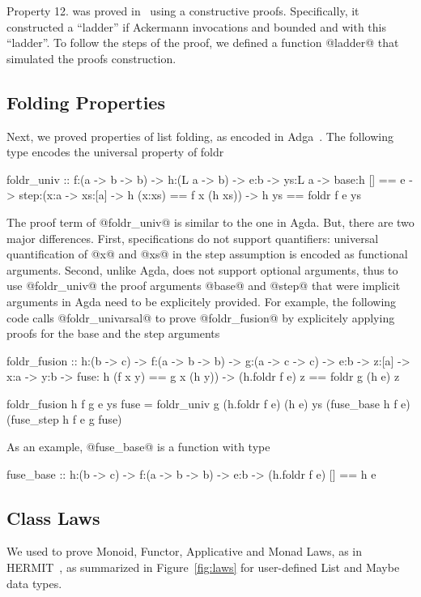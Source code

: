 Property 12. was proved in~\citep{ackermann} using a constructive proofs.
Specifically, it constructed a ``ladder'' if Ackermann invocations
and bounded  and  with this ``ladder''.
To follow the steps of the proof, we defined a function @ladder@ that
simulated the proofs construction.

\subsection{Folding Properties}\label{subsec:fold}

Next, we proved properties of list folding,
as encoded in Adga~\citep{agdaequational}.
%
The following type encodes the universal property of foldr
\begin{code}
  foldr_univ
    :: f:(a -> b -> b)
    -> h:(L a -> b)
    -> e:b
    -> ys:L a
    -> base:{h [] == e }
    -> step:(x:a -> xs:[a] ->
            {h (x:xs) == f x (h xs)})
    -> {h ys == foldr f e ys }
\end{code}
The \libname proof term of @foldr_univ@
is similar to the one in Agda.
But, there are two major differences.
First, specifications do not support quantifiers:
universal quantification of @x@ and @xs@ in
the step assumption is encoded as functional arguments.
Second, unlike Agda,
\libname does not support optional arguments,
thus to use @foldr_univ@ the proof arguments
@base@ and @step@ that were implicit arguments in Agda
need to be explicitely provided.
%
For example, the following code calls @foldr_univarsal@ to prove
@foldr_fusion@ by explicitely applying proofs for the base and the step arguments
\begin{code}
  foldr_fusion
   :: h:(b -> c)
   -> f:(a -> b -> b)
   -> g:(a -> c -> c)
   -> e:b
   -> z:[a]
   -> x:a -> y:b
   -> fuse: {h (f x y) == g x (h y)})
   -> {(h.foldr f e) z == foldr g (h e) z}

  foldr_fusion h f g e ys fuse
   = foldr_univ g (h.foldr f e) (h e) ys
       (fuse_base h f e)
       (fuse_step h f e g fuse)
\end{code}

As an example, @fuse_base@ is a function with type
\begin{code}
  fuse_base
   :: h:(b -> c)
   -> f:(a -> b -> b)
   -> e:b
   -> { (h.foldr f e) [] == h e }
\end{code}

\subsection{Class Laws}\label{subsec:class}

We used \libname to prove Monoid, Functor, Applicative and Monad Laws,
as in HERMIT~\citep{Farmer15}, as summarized
in Figure~\ref{fig:laws} for user-defined
List and Maybe data types.
%


